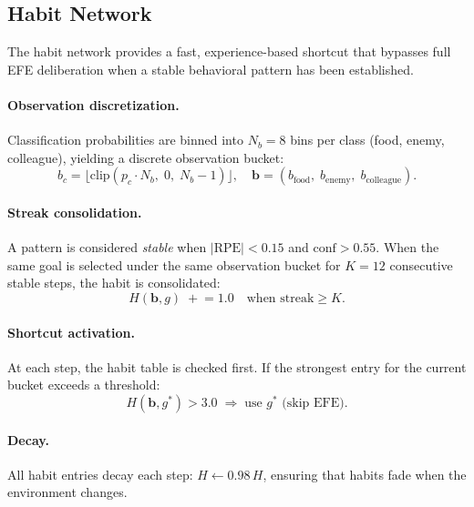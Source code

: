 \documentclass[11pt,a4paper]{article}
\begin{document}
\subsection{Habit Network}

The habit network provides a fast, experience-based shortcut that bypasses
full EFE deliberation when a stable behavioral pattern has been established.

\paragraph{Observation discretization.}
Classification probabilities are binned into $N_b = 8$ bins per class
(food, enemy, colleague), yielding a discrete observation bucket:
\begin{equation}\label{eq:habit_disc}
  b_c = \lfloor \text{clip}(p_c \cdot N_b,\; 0,\; N_b{-}1) \rfloor,
  \quad
  \mathbf{b} = (b_\text{food},\; b_\text{enemy},\; b_\text{colleague}).
\end{equation}

\paragraph{Streak consolidation.}
A pattern is considered \emph{stable} when $|\text{RPE}| < 0.15$ and
$\text{conf} > 0.55$.
When the same goal is selected under the same observation bucket for
$K = 12$ consecutive stable steps, the habit is consolidated:
\begin{equation}\label{eq:habit}
  H(\mathbf{b}, g) \;\mathrel{+}= 1.0 \quad \text{when streak} \geq K.
\end{equation}

\paragraph{Shortcut activation.}
At each step, the habit table is checked first.
If the strongest entry for the current bucket exceeds a threshold:
\[
  H(\mathbf{b}, g^*) > 3.0
  \;\Longrightarrow\;
  \text{use } g^* \text{ (skip EFE)}.
\]

\paragraph{Decay.}
All habit entries decay each step: $H \leftarrow 0.98\,H$, ensuring that
habits fade when the environment changes.
\end{document}
